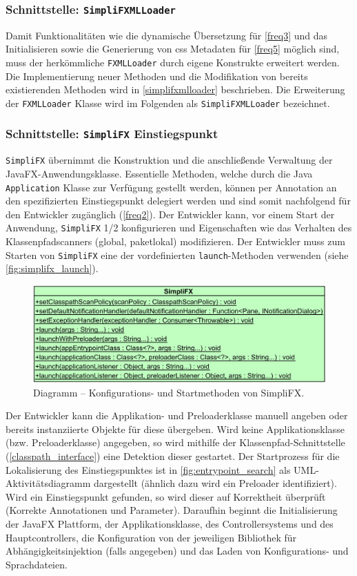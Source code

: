 \subsubsection{Schnittstelle: \texttt{SimpliFXMLLoader}}
Damit Funktionalitäten wie die dynamische Übersetzung für \autoref{freq3} und das Initialisieren sowie die Generierung von \ac{css} Metadaten für \autoref{freq5} möglich sind, muss der herkömmliche \texttt{FXMLLoader} durch eigene Konstrukte erweitert werden. Die Implementierung neuer Methoden und die Modifikation von bereits existierenden Methoden wird in \autoref{simplifxmlloader} beschrieben. Die Erweiterung der \texttt{FXMLLoader} Klasse wird im Folgenden als \texttt{SimpliFXMLLoader} bezeichnet.
\subsubsection{Schnittstelle: \texttt{SimpliFX} Einstiegspunkt}
\texttt{SimpliFX} übernimmt die Konstruktion und die anschließende Verwaltung der JavaFX-Anwendungsklasse. Essentielle Methoden, welche durch die Java \texttt{Application} Klasse zur Verfügung gestellt werden, können per Annotation an den spezifizierten Einstiegspunkt delegiert werden und sind somit nachfolgend für den Entwickler zugänglich (\autoref{freq2}). Der Entwickler kann, vor einem Start der Anwendung, \texttt{SimpliFX} 1/2 konfigurieren und Eigenschaften wie das Verhalten des Klassenpfadscanners (global, paketlokal) modifizieren. Der Entwickler muss zum Starten von \texttt{SimpliFX} eine der vordefinierten \texttt{launch}-Methoden verwenden (siehe \autoref{fig:simplifx_launch}). 
\begin{figure}[H]
	\centering
	\includegraphics[width=\textwidth]{Abbildungen/SimpliFX Einstiegspunkt.png}
	\caption{Diagramm -- Konfigurations- und Startmethoden von SimpliFX.}
	\label{fig:simplifx_launch}
\end{figure}
\noindent Der Entwickler kann die Applikation- und Preloaderklasse manuell angeben oder bereits instanziierte Objekte für diese übergeben. Wird keine Applikationsklasse (bzw. Preloaderklasse) angegeben, so wird mithilfe der Klassenpfad-Schnittstelle (\autoref{classpath_interface}) eine Detektion dieser gestartet. Der Startprozess für die Lokalisierung des Einstiegspunktes ist in \autoref{fig:entrypoint_search} als UML-Aktivitätsdiagramm dargestellt (ähnlich dazu wird ein Preloader identifiziert). Wird ein Einstiegspunkt gefunden, so wird dieser auf Korrektheit überprüft (Korrekte Annotationen und Parameter). Daraufhin beginnt die Initialisierung der JavaFX Plattform, der Applikationsklasse, des Controllersystems und des Hauptcontrollers, die Konfiguration von der jeweiligen Bibliothek für Abhängigkeitsinjektion (falls angegeben) und das Laden von Konfigurations- und Sprachdateien.

